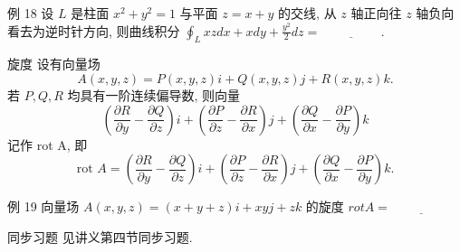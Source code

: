 例 18 设 \(L\) 是柱面 \(x^2 + y^2 = 1\) 与平面 \(z = x + y\) 的交线, 从 \(z\) 轴正向往 \(z\) 轴负向看去为逆时针方向, 则曲线积分 \(\oint_L xzdx + xdy + \frac{y^2}{2}dz = \underline{\hspace{2cm}}\).

旋度 设有向量场
\[A(x, y, z) = P(x, y, z)i + Q(x, y, z)j + R(x, y, z)k.\]
若 \(P, Q, R\) 均具有一阶连续偏导数, 则向量
\[ \left(\frac{\partial R}{\partial y} - \frac{\partial Q}{\partial z}\right)i + \left(\frac{\partial P}{\partial z} - \frac{\partial R}{\partial x}\right)j + \left(\frac{\partial Q}{\partial x} - \frac{\partial P}{\partial y}\right)k \]
记作 rot A, 即
\[ \text{rot } A = \left( \frac{\partial R}{\partial y} - \frac{\partial Q}{\partial z} \right) i + \left( \frac{\partial P}{\partial z} - \frac{\partial R}{\partial x} \right) j + \left( \frac{\partial Q}{\partial x} - \frac{\partial P}{\partial y} \right) k. \]

例 19 向量场 \(A(x, y, z) = (x + y + z)i + xyj + zk\) 的旋度 \(rot A = \underline{\hspace{2cm}}\)

同步习题
见讲义第四节同步习题.